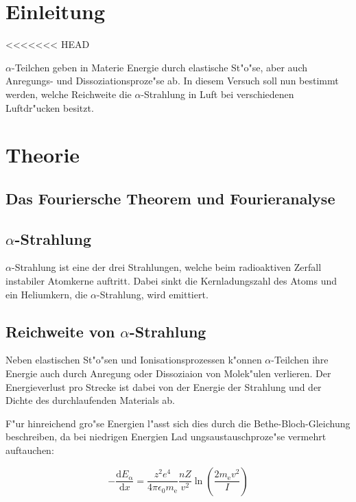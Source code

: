 \section{Einleitung} %
\label{sec:einleitung}
<<<<<<< HEAD
	
	$\alpha$-Teilchen geben in Materie Energie durch elastische St"o"se, aber auch Anregungs- und Dissoziationsproze"se ab. In diesem Versuch soll nun bestimmt werden, welche Reichweite die $\alpha$-Strahlung in Luft bei verschiedenen Luftdr"ucken besitzt.
	
\section{Theorie} %
\label{sec:theorie}
	\subsection{Das Fouriersche Theorem und Fourieranalyse}
	\label{subsec:fourier}

\subsection{$\alpha$-Strahlung} %
\label{sub:_alpha_strahlung}

$\alpha$-Strahlung ist eine der drei Strahlungen, welche beim radioaktiven Zerfall instabiler Atomkerne auftritt.
Dabei sinkt die Kernladungszahl des Atoms und ein Heliumkern, die $\alpha$-Strahlung, wird emittiert.

\subsection{Reichweite von $\alpha$-Strahlung} %
\label{sub:reichweite_von_alpha_strahlung}

Neben elastischen St"o"sen und Ionisationsprozessen k"onnen $\alpha$-Teilchen ihre Energie auch durch Anregung oder Dissoziaion von Molek"ulen verlieren. Der Energieverlust pro Strecke ist dabei von der Energie der Strahlung und der Dichte des durchlaufenden Materials ab.

F"ur hinreichend gro"se Energien l"asst sich dies durch die Bethe-Bloch-Gleichung beschreiben, da bei niedrigen Energien Lad
ungsaustauschproze"se vermehrt auftauchen:

\begin{equation}
	-\frac{\mathrm{d}E_\mathrm{\alpha}}{\mathrm{d}x} = \frac{z^2e^4}{4\pi \epsilon_\mathrm{0} m_\mathrm{e}} \frac{n Z}{v^2} \ln \left( \frac{2 m_\mathrm{e}v^2}{I} \right)
\end{equation}

